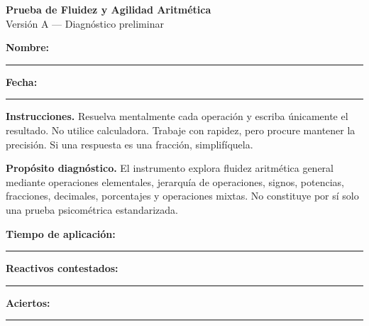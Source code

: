 \documentclass[11pt]{article}
\begin{document}
\begin{center}
{\Large\bfseries Prueba de Fluidez y Agilidad Aritmética}\\[1mm]
{\large Versión A --- Diagnóstico preliminar}
\end{center}

\vspace{1mm}

\textbf{Nombre:} \rule{9cm}{0.4pt}\hfill
\textbf{Fecha:} \rule{3cm}{0.4pt}

\vspace{2mm}

\textbf{Instrucciones.}
Resuelva mentalmente cada operación y escriba únicamente el resultado.
No utilice calculadora. Trabaje con rapidez, pero procure mantener la
precisión. Si una respuesta es una fracción, simplifíquela.

\medskip

\textbf{Propósito diagnóstico.}
El instrumento explora fluidez aritmética general mediante operaciones
elementales, jerarquía de operaciones, signos, potencias, fracciones,
decimales, porcentajes y operaciones mixtas. No constituye por sí solo
una prueba psicométrica estandarizada.

\medskip

\textbf{Tiempo de aplicación:} \rule{2.5cm}{0.4pt}
\hfill
\textbf{Reactivos contestados:} \rule{1.5cm}{0.4pt}
\hfill
\textbf{Aciertos:} \rule{1.5cm}{0.4pt}
\end{document}
